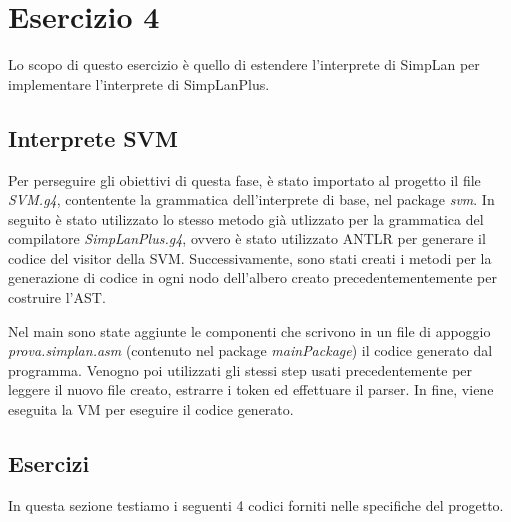 \section{Esercizio 4}
Lo scopo di questo esercizio è quello di estendere l'interprete di SimpLan per implementare l'interprete di SimpLanPlus. 

\subsection{Interprete SVM}
Per perseguire gli obiettivi di questa fase, è stato importato al progetto il file \textit{SVM.g4}, contentente la grammatica dell'interprete di base, nel package \textit{svm}. In seguito è stato utilizzato lo stesso metodo già utlizzato per la grammatica del compilatore \textit{SimpLanPlus.g4}, ovvero è stato utilizzato ANTLR per generare il codice del visitor della SVM. Successivamente, sono stati creati i metodi per la generazione di codice in ogni nodo dell'albero creato precedentementemente per costruire l'AST. 

Nel main sono state aggiunte le componenti che scrivono in un file di appoggio \textit{prova.simplan.asm} (contenuto nel package \textit{mainPackage}) il codice generato dal programma. Venogno poi utilizzati gli stessi step usati precedentemente per leggere il nuovo file creato, estrarre i token ed effettuare il parser. In fine, viene eseguita la VM per eseguire il codice generato.

\subsection{Esercizi}
In questa sezione testiamo i seguenti 4 codici forniti nelle specifiche del progetto.

